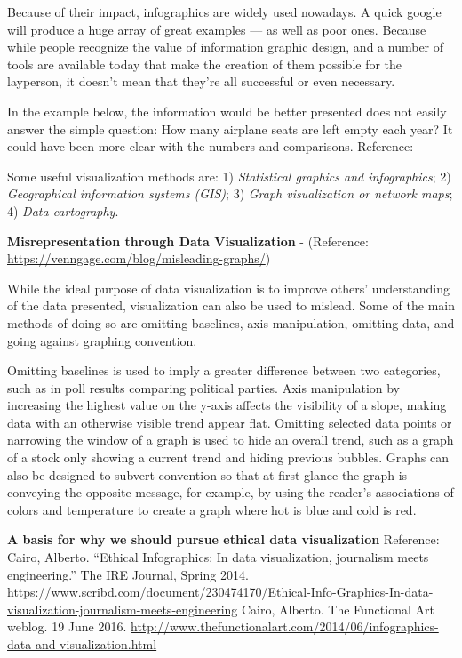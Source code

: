 \documentclass[]{book}
\theoremstyle{definition}
\theoremstyle{definition}
\theoremstyle{definition}
\theoremstyle{remark}
\begin{document}
Because of their impact, infographics are widely used nowadays. A quick
google will produce a huge array of great examples --- as well as poor
ones. Because while people recognize the value of information graphic
design, and a number of tools are available today that make the creation
of them possible for the layperson, it doesn't mean that they're all
successful or even necessary.

In the example below, the information would be better presented does not
easily answer the simple question: How many airplane seats are left
empty each year? It could have been more clear with the numbers and
comparisons. Reference: \citep{image_bad}

Some useful visualization methods are: 1) \emph{Statistical graphics and
infographics}; 2) \emph{Geographical information systems (GIS)}; 3)
\emph{Graph visualization or network maps}; 4) \emph{Data cartography}.

\textbf{Misrepresentation through Data Visualization} - (Reference:
\url{https://venngage.com/blog/misleading-graphs/})

While the ideal purpose of data visualization is to improve others'
understanding of the data presented, visualization can also be used to
mislead. Some of the main methods of doing so are omitting baselines,
axis manipulation, omitting data, and going against graphing convention.

Omitting baselines is used to imply a greater difference between two
categories, such as in poll results comparing political parties. Axis
manipulation by increasing the highest value on the y-axis affects the
visibility of a slope, making data with an otherwise visible trend
appear flat. Omitting selected data points or narrowing the window of a
graph is used to hide an overall trend, such as a graph of a stock only
showing a current trend and hiding previous bubbles. Graphs can also be
designed to subvert convention so that at first glance the graph is
conveying the opposite message, for example, by using the reader's
associations of colors and temperature to create a graph where hot is
blue and cold is red.

\textbf{A basis for why we should pursue ethical data visualization}
Reference: Cairo, Alberto. ``Ethical Infographics: In data
visualization, journalism meets engineering.'' The IRE Journal, Spring
2014.
\url{https://www.scribd.com/document/230474170/Ethical-Info-Graphics-In-data-visualization-journalism-meets-engineering}
Cairo, Alberto. The Functional Art weblog. 19 June 2016.
\url{http://www.thefunctionalart.com/2014/06/infographics-data-and-visualization.html}
\end{document}

